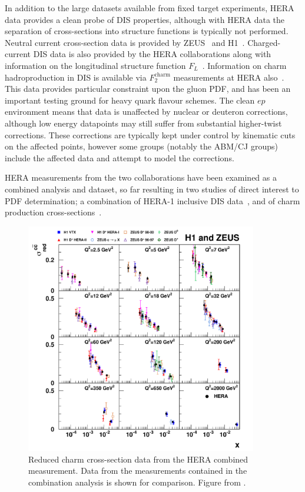 In addition to the large datasets available from fixed target experiments, HERA data provides a clean probe of DIS properties, although with HERA data the separation of cross-sections into structure functions is typically not performed. Neutral current cross-section data is provided by ZEUS~\cite{Breitweg:1998dz,Chekanov:2001qu,Chekanov:2002ej,Chekanov:2003yv} and H1~\cite{Adloff:2000qk,Adloff:2000qj,Adloff:2003uh}. Charged-current DIS data is also provided by the HERA collaborations \cite{Chekanov:2003vw,Adloff:2003uh} along with information on the longitudinal structure function $F_L$~\cite{Andreev:2013vha,Chekanov:2009na}. Information on charm hadroproduction in DIS is available via $F_2^{\mathrm{charm}}$ measurements at HERA also~\cite{Adloff:1996xq,Adloff:2001zj,Aktas:2005iw,Aktas:2004az,Breitweg:1999ad,Chekanov:2003rb,Chekanov:2007ch}. This data provides particular constraint upon the gluon PDF, and has been an important testing ground for heavy quark flavour schemes. The clean $ep$ environment means that data is unaffected by nuclear or deuteron corrections, although low energy datapoints may still suffer from substantial higher-twist corrections. These corrections are typically kept under control by kinematic cuts on the affected points, however some groups (notably the ABM/CJ groups) include the affected data and attempt to model the corrections.

HERA measurements from the two collaborations have been examined as a combined analysis and dataset, so far resulting in two studies of direct interest to PDF determination; a combination of HERA-1 inclusive DIS data~\cite{aaron:2009wt}, and of charm production cross-sections~\cite{Abramowicz:1900rp}.

\begin{figure}[ht!]
\centering
\includegraphics[width=0.9\textwidth]{3-PDFdet/figs/d12-172f3.pdf}
\caption[Combined reduced charm cross-section data from HERA]{Reduced charm cross-section data from the HERA combined measurement. Data from the measurements contained in the combination analysis is shown for comparison. Figure from \cite{Abramowicz:1900rp}.}
\label{fig:HERAF2c}
\end{figure}

